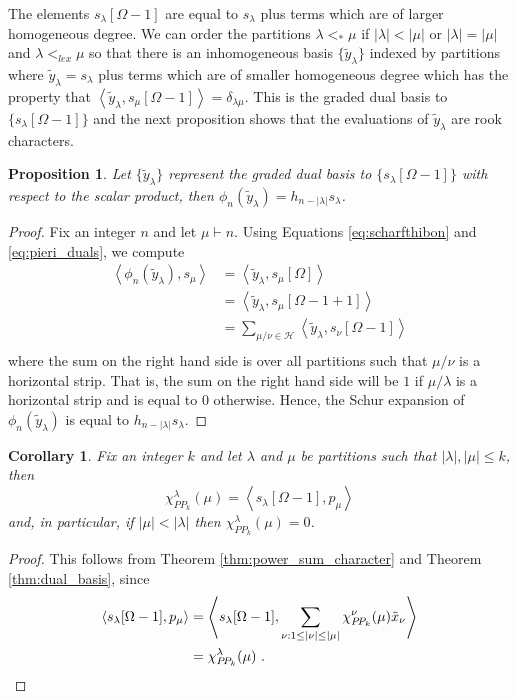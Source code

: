 \documentclass{amsart}
\newtheorem{prop}[lemma]{Proposition}
\newtheorem{corollary}[lemma]{Corollary}
\theoremstyle{definition}
\newcommand{\PP}{P\!P}
\begin{document}
The elements $s_\lambda[\Omega-1]$ are equal to $s_\lambda$ plus terms which
are of larger homogeneous degree.  We can order the partitions $\lambda <_* \mu$
if $|\lambda| < |\mu|$ or $|\lambda|=|\mu|$ and $\lambda <_{lex} \mu$
so that there is an inhomogeneous basis
$\{ \tilde{y}_\lambda \}$ indexed by partitions where
$\tilde{y}_\lambda = s_\lambda$ plus terms which are
of smaller homogeneous degree which has the property that
$\left< \tilde{y}_\lambda, s_\mu[\Omega-1] \right> = \delta_{\lambda\mu}$.
This is the graded dual basis to $\{ s_\lambda[\Omega-1] \}$
and the next proposition shows that the evaluations of $\tilde{y}_\lambda$
are rook characters.

\begin{prop} \label{prop:dual_basis}
Let $\{ \tilde{y}_\lambda \}$ represent the graded dual basis
to $\{s_\lambda[\Omega-1] \}$ with respect to the scalar product,
then $\phi_n( \tilde{y}_\lambda ) = h_{n - |\lambda|} s_\lambda$.
\end{prop}

\begin{proof}  Fix an integer $n$ and let $\mu \vdash n$.
Using Equations \eqref{eq:scharfthibon} and \eqref{eq:pieri_duals}, we compute
\begin{align*}
\left< \phi_{n}(\tilde{y}_\lambda), s_\mu \right>
&= \left< \tilde{y}_\lambda, s_\mu[\Omega] \right>\\
&= \left< \tilde{y}_\lambda, s_\mu[\Omega - 1 + 1] \right>\\
&= \sum_{\mu/\nu\in\mathcal{H}} \left< \tilde{y}_\lambda, s_\nu[\Omega - 1] \right>\\
\end{align*}
where the sum on the right hand side is over all partitions such
that $\mu/\nu$ is a horizontal strip.  That is, the sum on the right
hand side will be $1$ if $\mu/\lambda$ is a horizontal strip
and is equal to $0$ otherwise. Hence, the Schur expansion of
$\phi_{n}(\tilde{y}_\lambda)$ is equal to $h_{n-|\lambda|} s_\lambda$.
\end{proof}


\begin{corollary}
\label{corollary:PP_character_plethysm}
Fix an integer $k$ and let $\lambda$ and $\mu$ be partitions such that
$|\lambda|, |\mu| \leq k$, then
\[
\chi^\lambda_{\PP_k}(\mu) = \left< s_\lambda[\Omega-1], p_\mu \right>
\]
and, in particular, if $|\mu|<|\lambda|$ then $\chi^\lambda_{\PP_k}(\mu)=0$.
\end{corollary}
\begin{proof}
This follows from Theorem \ref{thm:power_sum_character}
and Theorem \ref{thm:dual_basis}, since
\begin{align*}
\left< s_\lambda[\Omega-1], p_\mu \right>
&= \left< s_\lambda[\Omega-1], \sum_{\nu : 1 \leq |\nu| \leq |\mu|}
\chi^\nu_{\PP_k}(\mu) \tilde{x}_\nu \right>\\
&= \chi^\lambda_{\PP_k}(\mu)~.\qedhere
\end{align*}
\end{proof}
\end{document}
